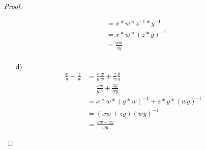 \documentclass{exam}
\begin{document}
\begin{proof}
\begin{enumerate}
\begin{align*}
			                                      & = x * w * z^{-1} * y^{-1}             \\
			                                      & = x * w * {(z * y)}^{-1}              \\
			                                      & = \frac{xw}{zy}                       \\
		      \end{align*}
		\item [d)]
		      \begin{align*}
			      \frac{x}{y} + \frac{z}{w} & = \frac{x}{y}\frac{w}{w} + \frac{z}{w}\frac{y}{y} \\
			                                & = \frac{xw}{yw} + \frac{zy}{wy}                   \\
			                                & = x*w * {(y*w)}^{-1} + z*y*{(wy)}^{-1}            \\
			                                & = (xw + zy){(wy)}^{-1}                            \\
			                                & = \frac{xw+zy}{wy}
		      \end{align*}
	\end{enumerate}
\end{proof}

\pagebreak
\end{document}
